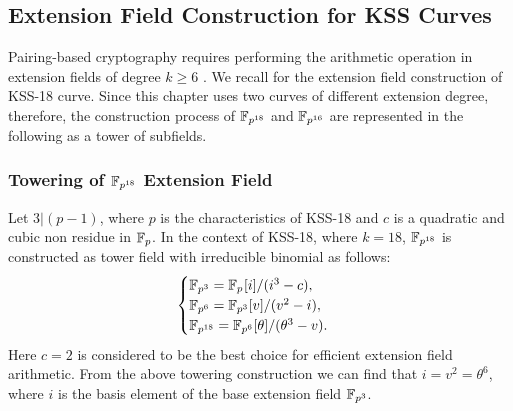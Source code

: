%



\subsection{Extension Field Construction for KSS Curves}
Pairing-based cryptography requires  performing the arithmetic operation in extension fields of degree $k \geq 6$ \cite{Silverman}. 
We recall  for the extension field construction of KSS-18 curve.
Since this chapter uses two curves of different extension degree, therefore, the construction process of $\mathbb{F}_{p^{18}}$ and $\mathbb{F}_{p^{16}}$ are represented in the following as a tower of subfields. 

\subsubsection{Towering of \texorpdfstring{$\mathbb{F}_{p^{18}}$}{} Extension Field}
Let $3|(p-1)$, where $p$ is the characteristics of KSS-18 and $c$ is a quadratic and cubic non residue in ${\mathbb{F}}_{p}$. In the context  of KSS-18, where $k=18$, $\mathbb{F}_{p^{18}}$ is constructed as tower field with irreducible binomial as follows:
\begin{equation}\label{eq:KSS-18_towering_chap_ijnc2017}
\begin{cases}
{\mathbb{F}}_{p^{3}} = {\mathbb{F}}_{p^{}}[i]/(i^3-c),  \\ 
{\mathbb{F}}_{p^{6}} = {\mathbb{F}}_{p^{3}}[v]/(v^2-i),  \\ 
{\mathbb{F}}_{p^{18}} = {\mathbb{F}}_{p^{6}}[\theta]/(\theta^3-v). \\ 
\end{cases}
\end{equation}
Here $c = 2$ is considered to be the best choice for efficient extension field arithmetic.
From the above towering construction we can find that $i=v^2=\theta^6$, where $i$ is the basis element of the base extension field $\mathbb{F}_{p^3}$. 

